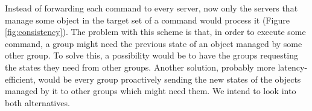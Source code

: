 \documentclass[]{usiinfprospectus}
\begin{document}
Instead of forwarding each command to every server, now only the servers that manage some object in the target set of a command would process it (Figure \ref{fig:consistency}). The problem with this scheme is that, in order to execute some command, a group might need the previous state of an object managed by some other group. To solve this, a possibility would be to have the groups requesting the states they need from other groups. Another solution, probably more latency-efficient, would be every group proactively sending the new states of the objects managed by it to other groups which might need them. We intend to look into both alternatives.




% 
\end{document}
